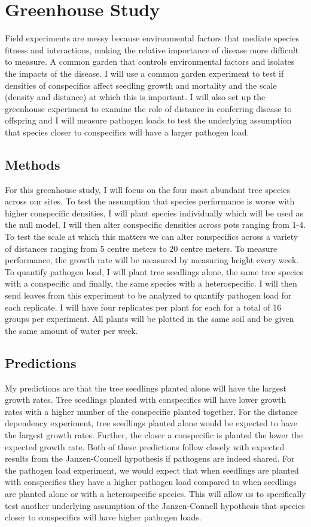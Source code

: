 \documentclass{article}
\begin{document}
\section{Greenhouse Study}
Field experiments are messy because environmental factors that mediate species fitness and interactions, making the relative importance of disease more difficult to measure. A common garden that controls environmental factors and isolates the impacts of the disease. I will use a common garden experiment to test if densities of conspecifics affect seedling growth and mortality and the scale (density and distance) at which this is important. I will also set up the greenhouse experiment to examine the role of distance in conferring disease to offspring and I will measure pathogen loads to test the underlying assumption that species closer to conspecifics will have a larger pathogen load. 

\subsection{Methods}
For this greenhouse study, I will focus on the four most abundant tree species across our sites. To test the assumption that species performance is worse with higher conspecific densities, I will plant species individually which will be used as the null model, I will then alter conspecific densities across pots ranging from 1-4. To test the scale at which this matters we can alter conspecifics across a variety of distances ranging from 5 centre meters to 20 centre meters. To measure performance, the growth rate will be measured by measuring height every week. To quantify pathogen load, I will plant tree seedlings alone, the same tree species with a conspecific and finally, the same species with a heterospecific. I will then send leaves from this experiment to be analyzed to quantify pathogen load for each replicate. I will have four replicates per plant for each for a total of 16 groups per experiment. All plants will be plotted in the same soil and be given the same amount of water per week.

\subsection{Predictions}
My predictions are that the tree seedlings planted alone will have the largest growth rates. Tree seedlings planted with conspecifics will have lower growth rates with a higher number of the conspecific planted together. For the distance dependency experiment, tree seedlings planted alone would be expected to have the largest growth rates. Further, the closer a conspecific is planted the lower the expected growth rate. Both of these predictions follow closely with expected results from the Janzen-Connell hypothesis if pathogens are indeed shared. For the pathogen load experiment, we would expect that when seedlings are planted with conspecifics they have a higher pathogen load compared to when seedlings are planted alone or with a heterospecific species. This will allow us to specifically test another underlying assumption of the Janzen-Connell hypothesis that species closer to conspecifics will have higher pathogen loads. 
\end{document}
